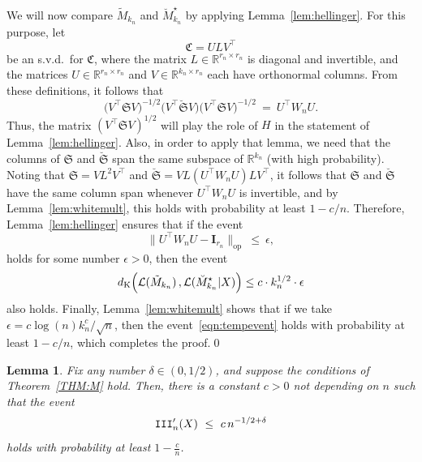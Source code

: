 \documentclass[aos,preprint]{imsart}
\numberwithin{equation}{section}
\theoremstyle{plain}
\newtheorem{lemma}{Lemma}[section]
\newcommand{\R}{\mathbb{R}}
\newcommand{\bIII}{\textup{\texttt{III}}}
\newcommand{\dK}{d_{\textup{K}}}
\renewcommand{\L}{\mathcal{L}}
\newcommand{\e}{\epsilon}
\newcommand{\ttop}{^{\top}}
\newcommand{\1}{{\bf{1}}}
\newcommand{\0}{\mathbf{0}}
\begin{document}
We will now compare $\tilde M_{k_n}$ and $\breve M_{k_n}^{\star}$ by applying Lemma~\ref{lem:hellinger}. For this purpose, let
\begin{equation}\label{eqn:Udef}
\mathfrak{C}=ULV\ttop
\end{equation}
be an s.v.d.~for $\mathfrak{C}$, where the matrix $L\in\R^{r_n\times r_n}$ is diagonal and invertible, and the matrices $U\in\R^{r_n\times r_n}$ and $V\in\R^{k_n\times r_n}$ each have orthonormal columns. From these definitions, it follows that
%
%
\begin{equation}
\Big(V\ttop \mathfrak{S} V\Big)^{-1/2}\Big( V\ttop \breve{\mathfrak{S}}V\Big) \Big(V\ttop\mathfrak{S}V\Big)^{-1/2} \ = \ U\ttop W_n U.
\end{equation}
Thus, the matrix $(V\ttop \mathfrak{S} V)^{1/2}$ will play the role of $H$ in the statement of Lemma~\ref{lem:hellinger}.
Also, in order to apply that lemma, we need that the columns of $\mathfrak{S}$ and $\breve{\mathfrak{S}}$ span the same subspace of $\R^{k_n}$ (with high probability). Noting that $\mathfrak{S}=VL^2 V\ttop$ and $\breve{\mathfrak{S}} =VL (U\ttop W_n U)L V\ttop$, it follows that $\mathfrak{S}$ and $\breve{\mathfrak{S}}$ have the same column span whenever $U\ttop W_n U$ is invertible, and by Lemma~\ref{lem:whitemult}, this holds with probability at least $1-c/n$. Therefore, Lemma~\ref{lem:hellinger} ensures that if the event
 \begin{equation}\label{eqn:tempevent}
 \|U\ttop W_n U-\mathbf{I}_{r_n}\|_{\text{op}} \ \leq \ \e,
 \end{equation}
 holds for some number $\e>0$, then the event
\begin{equation}
 \dK\Big(\L(\tilde M_{k_n})\, , \L(\breve M_{k_n}^{\star}|X)\Big) \leq c\cdot  k_n^{1/2} \cdot \e
\end{equation}
also holds. Finally, Lemma~\ref{lem:whitemult} shows that if we take $\e= c\log(n)k_n^c/\sqrt{n}$, then the event~\eqref{eqn:tempevent} holds with probability at least $1-c/n$, which completes the proof.\qed




\begin{lemma}\label{lem:IIIprimeM}
Fix any number $\delta\in(0,1/2)$, and suppose the conditions of Theorem~\ref{THM:M} hold. Then, there is a constant $c>0$ not depending on $n$ such that the event
\begin{equation}
\bIII_n'(X) \ \leq \ c\, n^{-1/2+\delta}
\end{equation}
holds with probability at least $1-\frac cn$.
\end{lemma}
\end{document}
